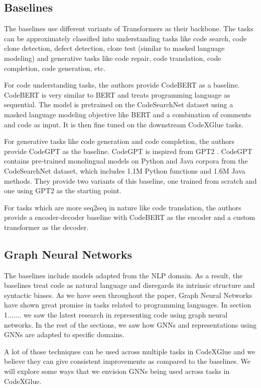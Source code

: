 \documentclass{article}
\begin{document}
\subsection{Baselines}
The baselines use different variants of Transformers as their backbone. The tasks can be approximately classified into understanding tasks like code search, code clone detection, defect detection, cloze test (similar to masked language modeling) and generative tasks like code repair, code translation, code completion, code generation, etc.

For code understanding tasks, the authors provide CodeBERT \cite{feng2020codebert} as a baseline. CodeBERT is very similar to BERT \cite{devlin2018bert} and treats programming language as sequential. The model is pretrained on the CodeSearchNet dataset \cite{husain2019codesearchnet} using a masked language modeling objective like BERT and a combination of comments and code as input. It is then fine tuned on the downstream CodeXGlue tasks.

For generative tasks like code generation and code completion, the authors provide CodeGPT as the baseline. CodeGPT is inspired from GPT2 \cite{radford2019better}. CodeGPT contains pre-trained monolingual models on Python and Java corpora from the CodeSearchNet dataset, which includes 1.1M Python functions and 1.6M Java methods. They provide two variants of this baseline, one trained from scratch and one using GPT2 as the starting point.

For tasks which are more seq2seq in nature like code translation, the authors provide a encoder-decoder baseline with CodeBERT as the encoder and a custom transformer as the decoder.

\subsection{Graph Neural Networks}
The baselines include models adapted from the NLP domain. As a result, the baselines treat code as natural language and disregards its intrinsic structure and syntactic biases. As we have seen throughout the paper, Graph Neural Networks have shown great promise in tasks related to programming languages. In section 1....... we saw the latest research in representing code using graph neural networks. In the rest of the sections, we saw how GNNs and representations using GNNs are adapted to specific domains. 

A lot of those techniques can be used across multiple tasks in CodeXGlue and we believe they can give consistent improvements as compared to the baselines. We will explore some ways that we envision GNNs being used across tasks in CodeXGlue.
\end{document}
